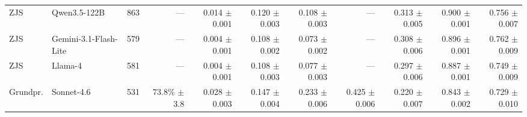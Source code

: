 \begin{table}[t]
{\begin{tabular}{llrrrrrrrrr}
ZJS & Qwen3.5-122B & 863 & --- & \shortstack[r]{0.014\\{\scriptsize $\pm$0.001}} & \shortstack[r]{0.120\\{\scriptsize $\pm$0.003}} & \shortstack[r]{0.108\\{\scriptsize $\pm$0.003}} & --- & \shortstack[r]{0.313\\{\scriptsize $\pm$0.005}} & \shortstack[r]{0.900\\{\scriptsize $\pm$0.001}} & \shortstack[r]{0.756\\{\scriptsize $\pm$0.007}} \\
ZJS & Gemini-3.1-Flash-Lite & 579 & --- & \shortstack[r]{0.004\\{\scriptsize $\pm$0.001}} & \shortstack[r]{0.108\\{\scriptsize $\pm$0.002}} & \shortstack[r]{0.073\\{\scriptsize $\pm$0.002}} & --- & \shortstack[r]{0.308\\{\scriptsize $\pm$0.006}} & \shortstack[r]{0.896\\{\scriptsize $\pm$0.001}} & \shortstack[r]{0.762\\{\scriptsize $\pm$0.009}} \\
ZJS & Llama-4 & 581 & --- & \shortstack[r]{0.004\\{\scriptsize $\pm$0.001}} & \shortstack[r]{0.108\\{\scriptsize $\pm$0.003}} & \shortstack[r]{0.077\\{\scriptsize $\pm$0.003}} & --- & \shortstack[r]{0.297\\{\scriptsize $\pm$0.006}} & \shortstack[r]{0.887\\{\scriptsize $\pm$0.001}} & \shortstack[r]{0.749\\{\scriptsize $\pm$0.009}} \\
\midrule
Grundpr. & Sonnet-4.6 & 531 & \shortstack[r]{73.8\%\\{\scriptsize $\pm$3.8}} & \shortstack[r]{0.028\\{\scriptsize $\pm$0.003}} & \shortstack[r]{0.147\\{\scriptsize $\pm$0.004}} & \shortstack[r]{0.233\\{\scriptsize $\pm$0.006}} & \shortstack[r]{0.425\\{\scriptsize $\pm$0.006}} & \shortstack[r]{0.220\\{\scriptsize $\pm$0.007}} & \shortstack[r]{0.843\\{\scriptsize $\pm$0.002}} & \shortstack[r]{0.729\\{\scriptsize $\pm$0.010}} \\

\end{tabular}}
\end{table}
